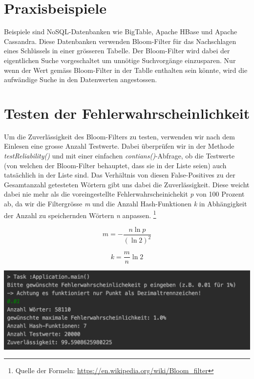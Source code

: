 \documentclass[12pt]{article}
\begin{document}
\section{Praxisbeispiele}
Beispiele sind NoSQL-Datenbanken wie BigTable, Apache HBase und Apache Cassandra. Diese Datenbanken verwenden Bloom-Filter für das Nachschlagen eines Schlüssels in einer grösseren Tabelle. Der Bloom-Filter wird dabei der eigentlichen Suche vorgeschaltet um unnötige Suchvorgänge einzusparen. Nur wenn der Wert gemäss Bloom-Filter in der Tablle enthalten sein könnte, wird die aufwändige Suche in den Datenwerten angestossen.

\section{Testen der Fehlerwahrscheinlichkeit}
Um die Zuverlässigkeit des Bloom-Filters zu testen, verwenden wir nach dem Einlesen eine grosse Anzahl Testwerte.
Dabei überprüfen wir in der Methode \textit{testReliability()} und mit einer einfachen \textit{contians()}-Abfrage,
ob die Testwerte (von welchen der Bloom-Filter behauptet, dass sie in der Liste seien) auch tatsächlich in der Liste sind.
Das Verhältnis von diesen False-Positives zu der Gesamtanzahl getesteten Wörtern gibt uns dabei die Zuverlässigkeit.
Diese weicht dabei nie mehr als die voreingestellte Fehlerwahrscheinichekit \textit{p} von 100 Prozent ab, da wir die Filtergrösse \textit{m} und
die Anzahl Hash-Funktionen \textit{k} in Abhängigkeit der Anzahl zu speichernden Wörtern \textit{n} anpassen. \footnote{Quelle der Formeln: \url{https://en.wikipedia.org/wiki/Bloom_filter}}

\[
m = - \frac{n \ln p}{(\ln 2)^2}
\]

\[
k = \frac{m}{n} \ln 2
\]


\includegraphics{screenshot}
\end{document}
